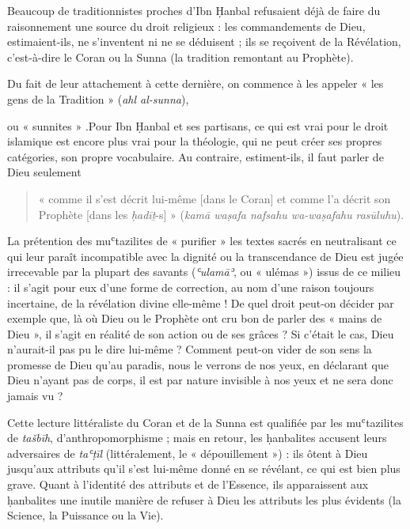 Beaucoup de traditionnistes proches d'Ibn Ḥanbal refusaient déjà de
faire du raisonnement une source du droit religieux : les commandements
de Dieu, estimaient-ils, ne s'inventent ni ne se déduisent ; ils se
reçoivent de la Révélation, c'est-à-dire le Coran ou la Sunna (la
tradition remontant au Prophète). 
\begin{Def}[sunnisme]
Du fait de leur attachement à cette
dernière, on commence à les appeler « les gens de la Tradition »
(\emph{ahl al-sunna}),
\end{Def}
ou « sunnites » .Pour Ibn Ḥanbal et ses
partisans, ce qui est vrai pour le droit islamique est encore plus vrai
pour la théologie, qui ne peut créer ses propres catégories, son propre
vocabulaire. Au contraire, estiment-ils, il faut parler de Dieu
seulement
\begin{quote}
    « comme il s'est décrit lui-même {[}dans le Coran{]}
et comme l'a décrit son Prophète {[}dans les \emph{ḥadīṯ}-s{]} »
(\emph{kamā waṣafa nafsahu wa-waṣafahu}
\emph{rasūluhu}).
\end{quote}

La prétention des muʿtazilites de « purifier » les textes sacrés en
neutralisant ce qui leur paraît incompatible avec la dignité ou la
transcendance de Dieu est jugée irrecevable par la plupart des savants
(\emph{ʿulamāʾ}, ou « ulémas ») issus de ce milieu : il s'agit pour eux
d'une forme de correction, au nom d'une raison toujours incertaine, de
la révélation divine elle-même ! De quel droit peut-on décider par
exemple que, là où Dieu ou le Prophète ont cru bon de parler des « mains
de Dieu », il s'agit en réalité de son action ou de ses grâces ? Si
c'était le cas, Dieu n'aurait-il pas pu le dire lui-même ? Comment
peut-on vider de son sens la promesse de Dieu qu'au paradis, nous le
verrons de nos yeux, en déclarant que Dieu n'ayant pas de corps, il est
par nature invisible à nos yeux et ne sera donc jamais vu ?

Cette lecture littéraliste du Coran et de la Sunna est qualifiée par les
muʿtazilites de \emph{tašbīh},  d'anthropomorphisme ; mais en retour, les
ḥanbalites accusent leurs adversaires de \emph{taʿṭīl} (littéralement,
le « dépouillement ») : ils ôtent à Dieu jusqu'aux attributs qu'il s'est
lui-même donné en se révélant, ce qui est bien plus grave. Quant à
l'identité des attributs et de l'Essence, ils apparaissent aux
ḥanbalites une inutile manière de refuser à Dieu les attributs les plus
évidents (la Science, la Puissance ou la Vie). 
